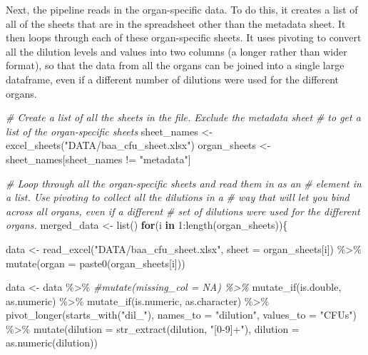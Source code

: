 \documentclass[
]{book}
\newenvironment{Shaded}{\begin{snugshade}}{\end{snugshade}}
\newcommand{\AttributeTok}[1]{\textcolor[rgb]{0.77,0.63,0.00}{#1}}
\newcommand{\CommentTok}[1]{\textcolor[rgb]{0.56,0.35,0.01}{\textit{#1}}}
\newcommand{\ControlFlowTok}[1]{\textcolor[rgb]{0.13,0.29,0.53}{\textbf{#1}}}
\newcommand{\DecValTok}[1]{\textcolor[rgb]{0.00,0.00,0.81}{#1}}
\newcommand{\FunctionTok}[1]{\textcolor[rgb]{0.00,0.00,0.00}{#1}}
\newcommand{\NormalTok}[1]{#1}
\newcommand{\OtherTok}[1]{\textcolor[rgb]{0.56,0.35,0.01}{#1}}
\newcommand{\SpecialCharTok}[1]{\textcolor[rgb]{0.00,0.00,0.00}{#1}}
\newcommand{\StringTok}[1]{\textcolor[rgb]{0.31,0.60,0.02}{#1}}
\begin{document}
Next, the pipeline reads in the organ-specific data. To do this, it creates a
list of all of the sheets that are in the spreadsheet other than the metadata
sheet. It then loops through each of these organ-specific sheets. It uses
pivoting to convert all the dilution levels and values into two columns
(a longer rather than wider format), so that the data from all the organs can
be joined into a single large dataframe, even if a different number of dilutions
were used for the different organs.

\begin{Shaded}
\begin{Highlighting}[]
\CommentTok{\# Create a list of all the sheets in the file. Exclude the metadata sheet }
\CommentTok{\# to get a list of the organ{-}specific sheets}
\NormalTok{sheet\_names }\OtherTok{\textless{}{-}} \FunctionTok{excel\_sheets}\NormalTok{(}\StringTok{"DATA/baa\_cfu\_sheet.xlsx"}\NormalTok{)}
\NormalTok{organ\_sheets }\OtherTok{\textless{}{-}}\NormalTok{ sheet\_names[sheet\_names }\SpecialCharTok{!=} \StringTok{"metadata"}\NormalTok{]}

\CommentTok{\# Loop through all the organ{-}specific sheets and read them in as an }
\CommentTok{\# element in a list. Use pivoting to collect all the dilutions in a }
\CommentTok{\# way that will let you bind across all organs, even if a different}
\CommentTok{\# set of dilutions were used for the different organs.}
\NormalTok{merged\_data }\OtherTok{\textless{}{-}} \FunctionTok{list}\NormalTok{()}
\ControlFlowTok{for}\NormalTok{(i }\ControlFlowTok{in} \DecValTok{1}\SpecialCharTok{:}\FunctionTok{length}\NormalTok{(organ\_sheets))\{}
  
\NormalTok{  data }\OtherTok{\textless{}{-}} \FunctionTok{read\_excel}\NormalTok{(}\StringTok{"DATA/baa\_cfu\_sheet.xlsx"}\NormalTok{, }
                     \AttributeTok{sheet =}\NormalTok{ organ\_sheets[i]) }\SpecialCharTok{\%\textgreater{}\%} 
    \FunctionTok{mutate}\NormalTok{(}\AttributeTok{organ =} \FunctionTok{paste0}\NormalTok{(organ\_sheets[i]))}
  
\NormalTok{  data }\OtherTok{\textless{}{-}}\NormalTok{ data }\SpecialCharTok{\%\textgreater{}\%} 
    \CommentTok{\#mutate(missing\_col = NA) \%\textgreater{}\% }
    \FunctionTok{mutate\_if}\NormalTok{(is.double, as.numeric) }\SpecialCharTok{\%\textgreater{}\%} 
    \FunctionTok{mutate\_if}\NormalTok{(is.numeric, as.character) }\SpecialCharTok{\%\textgreater{}\%} 
    \FunctionTok{pivot\_longer}\NormalTok{(}\FunctionTok{starts\_with}\NormalTok{(}\StringTok{"dil\_"}\NormalTok{), }\AttributeTok{names\_to =} \StringTok{"dilution"}\NormalTok{,}
                 \AttributeTok{values\_to =} \StringTok{"CFUs"}\NormalTok{) }\SpecialCharTok{\%\textgreater{}\%} 
    \FunctionTok{mutate}\NormalTok{(}\AttributeTok{dilution =} \FunctionTok{str\_extract}\NormalTok{(dilution, }\StringTok{"[0{-}9]+"}\NormalTok{),}
           \AttributeTok{dilution =} \FunctionTok{as.numeric}\NormalTok{(dilution))}
    

\end{Highlighting}
\end{Shaded}
\end{document}

